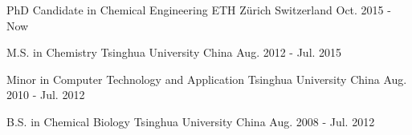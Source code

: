 

\begin{cventries}
\cventry
{PhD Candidate in Chemical Engineering} %
{ETH Z\"{u}rich} %
{Switzerland} %
{Oct. 2015 - Now} %
{
}

\cventry
{M.S. in Chemistry} %
{Tsinghua University} %
{China} %
{Aug. 2012 - Jul. 2015} %
{
}

\cventry
{Minor in Computer Technology and Application}
{Tsinghua University}
{China}
{Aug. 2010 - Jul. 2012}
{
}

\cventry
{B.S. in Chemical Biology} %
{Tsinghua University} %
{China} %
{Aug. 2008 - Jul. 2012} %
{
}
   
\end{cventries}
